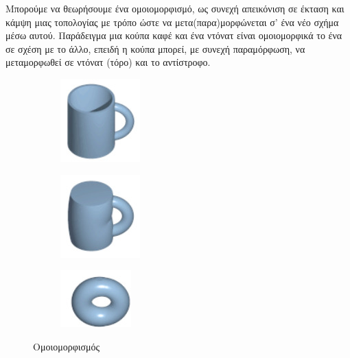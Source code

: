 \begin{corollary} 
    Μπορούμε να θεωρήσουμε ένα ομοιομορφισμό, ως συνεχή απεικόνιση σε έκταση και κάμψη μιας τοπολογίας με τρόπο ώστε να μετα(παρα)μορφώνεται σ' ένα νέο σχήμα μέσω αυτού.
    Παράδειγμα μια κούπα καφέ και ένα ντόνατ είναι ομοιομορφικά το ένα σε σχέση με το άλλο, επειδή η κούπα μπορεί, με συνεχή παραμόρφωση, να μεταμορφωθεί σε ντόνατ (τόρο) και το αντίστροφο.
    \begin{figure}[H]
      \centering
      \begin{subfigure}{0.2\textwidth}
        \centering
        \includegraphics[width=0.5\linewidth]{images/chapter2_img/cup.jpg}
      \end{subfigure}
      \begin{subfigure}{0.2\textwidth}
        \includegraphics[width=0.5\linewidth]{images/chapter2_img/mid-tor-don.jpg}
      \end{subfigure}
      \begin{subfigure}{0.2\textwidth}
        \includegraphics[width=0.5\linewidth]{images/chapter2_img/don.jpg}
      \end{subfigure}
      \caption{Ομοιομορφισμός}
    \end{figure}
\end{corollary}
